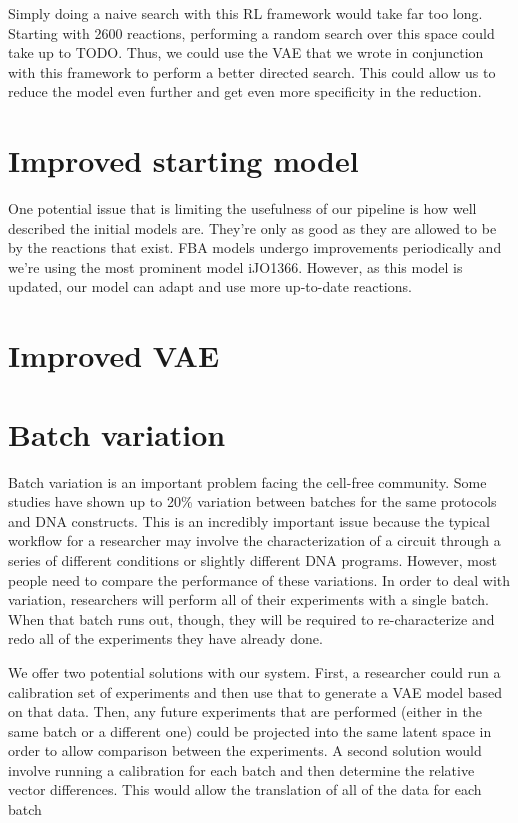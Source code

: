 Simply doing a naive search with this RL framework would take far too long.
Starting with 2600 reactions, performing a random search over this space could take up to TODO.
Thus, we could use the VAE that we wrote in conjunction with this framework to perform a better directed search.
This could allow us to reduce the model even further and get even more specificity in the reduction.

\section{Improved starting model}
One potential issue that is limiting the usefulness of our pipeline is how well described the initial models are.
They're only as good as they are allowed to be by the reactions that exist.
FBA models undergo improvements periodically and we're using the most prominent model iJO1366.
However, as this model is updated, our model can adapt and use more up-to-date reactions.

\section{Improved VAE}


\section{Batch variation}
Batch variation is an important problem facing the cell-free community.
Some studies have shown up to 20\% variation between batches for the same protocols and DNA constructs.
This is an incredibly important issue because the typical workflow for a researcher may involve the characterization of a circuit through a series of different conditions or slightly different DNA programs.
However, most people need to compare the performance of these variations.
In order to deal with variation, researchers will perform all of their experiments with a single batch.
When that batch runs out, though, they will be required to re-characterize and redo all of the experiments they have already done.

We offer two potential solutions with our system.
First, a researcher could run a calibration set of experiments and then use that to generate a VAE model based on that data.
Then, any future experiments that are performed (either in the same batch or a different one) could be projected into the same latent space in order to allow comparison between the experiments.
A second solution would involve running a calibration for each batch and then determine the relative vector differences.
This would allow the translation of all of the data for each batch